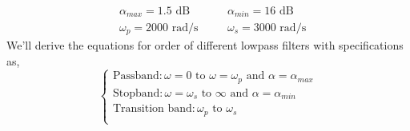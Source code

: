 \begin{equation*}
\begin{aligned}
   & \alpha_{max}=1.5 \text{ dB} \quad && \alpha_{min}=16 \text{ dB}\\
   & \omega_p=2000 \text{ rad/s} \quad && \omega_s=3000 \text{ rad/s}
\end{aligned}
\end{equation*}
We'll derive the equations for order of different lowpass filters with specifications as,
\begin{equation*}
   \begin{cases}
      \text{Passband}:\omega=0 \text{ to }\omega=\omega_p \text{ and } \alpha=\alpha_{max}\\
      \text{Stopband}:\omega=\omega_s \text{ to }\infty \text{ and } \alpha=\alpha_{min}\\
      \text{Transition band}: \omega_p \text{ to } \omega_s\\
   \end{cases}
\end{equation*}
